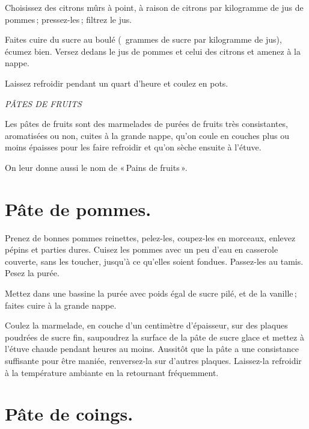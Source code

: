 Choisissez des citrons mûrs à point, à raison de {\mmm} citrons par
kilogramme de jus de pommes ; pressez-les ; filtrez le jus.

Faites cuire du sucre au boulé ({\mmm} {\mmm} grammes de sucre par
kilogramme de jus), écumez bien. Versez dedans le jus de pommes et celui des
citrons et amenez à la nappe.

Laissez refroidir pendant un quart d'heure et coulez en pots.

\bigskip

\begin{center}
\textit{PÂTES DE FRUITS}
\end{center}

\bigskip


Les pâtes de fruits sont des marmelades de purées de fruits très consistantes,
aromatisées ou non, cuites à la grande nappe, qu'on coule en couches plus ou
moins épaisses pour les faire refroidir et qu'on sèche ensuite à l'étuve.

On leur donne aussi le nom de « Pains de fruits ».

\section*{\centering Pâte de pommes.}
{}

Prenez de bonnes pommes reinettes, pelez-les, coupez-les en morceaux, enlevez
pépins et parties dures. Cuisez les pommes avec un peu d'eau en casserole
couverte, sans les toucher, jusqu'à ce qu'elles soient fondues. Passez-les au
tamis. Pesez la purée.

Mettez dans une bassine la purée avec poids égal de sucre pilé, et de la
vanille ; faites cuire à la grande nappe.

Coulez la marmelade, en couche d'un centimètre d'épaisseur, sur des plaques
poudrées de sucre fin, saupoudrez la surface de la pâte de sucre glace et
mettez à l'étuve chaude pendant {\mmm} heures au moins. Aussitôt que la
pâte a une consistance suffisante pour être maniée, renversez-la sur d'autres
plaques. Laissez-la refroidir à la température ambiante en la retournant
fréquemment.

\section*{\centering Pâte de coings.}
{}


